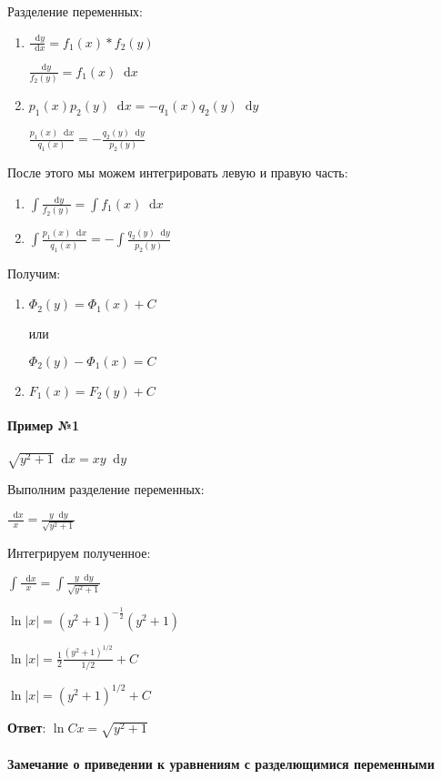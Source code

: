 \documentclass{article}
\newcommand*\diff{\mathop{}\!\mathrm{d}}
\begin{document}
Разделение переменных:

\begin{enumerate}
    \item $\frac{\diff y}{\diff x} = f_1(x) * f_2(y)$

    $\frac{\diff y}{f_2(y)} = f_1(x) \diff x$
    \item $p_1(x) p_2(y) \diff x = -q_1(x) q_2(y) \diff y$

    $\frac{p_1(x) \diff x}{q_1(x)} = -\frac{q_2(y) \diff y}{p_2(y)}$
\end{enumerate}

После этого мы можем интегрировать левую и правую часть:

\begin{enumerate}
    \item $\int \frac{\diff y}{f_2(y)} = \int f_1(x) \diff x$
    \item $\int \frac{p_1(x) \diff x}{q_1(x)} = -\int \frac{q_2(y) \diff y}{p_2(y)}$
\end{enumerate}

Получим:

\begin{enumerate}
    \item $\Phi_2(y) = \Phi_1(x) + C$

    или

    $\Phi_2(y) - \Phi_1(x) = C$
    \item $F_1(x) = F_2(y) + C$
\end{enumerate}

\paragraph{Пример №1}

$\sqrt{y^2 + 1} \diff x = xy \diff y$

Выполним разделение переменных:

$\frac{\diff x}{x} = \frac{y \diff y}{\sqrt{y^2 + 1}}$

Интегрируем полученное:

$\int \frac{\diff x}{x} = \int \frac{y \diff y}{\sqrt{y^2 + 1}}$

$\ln |x| = (y^2 + 1)^{-\frac{1}{2}} (y^2 + 1)$

$\ln |x| = \frac{1}{2} \frac{(y^2 + 1)^{1/2}}{1/2} + C$

$\ln |x| = (y^2 + 1)^{1/2} + C$

\textbf{Ответ}: $\ln Cx = \sqrt{y^2 + 1}$

\paragraph{Замечание о приведении к уравнениям с разделющимися переменными}
\end{document}
